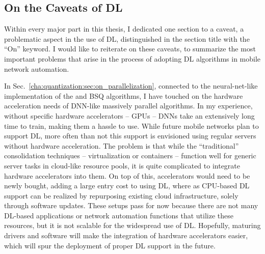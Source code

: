		\subsection{On the Caveats of DL}
			
			Within every major part in this thesis, I dedicated one section to a caveat, a problematic aspect in the use of \ac{DL}, distinguished in the section title with the ``On'' keyword.
			I would like to reiterate on these caveats, to summarize the most important problems that arise in the process of adopting \ac{DL} algorithms in mobile network automation.
			
			In Sec.~\ref{cha:quantization:sec:on_parallelization}, connected to the neural-net-like implementation of the \kmeans{} and \ac{BSQ} algorithms, I have touched on the hardware acceleration needs of \ac{DNN}-like massively parallel algorithms.
			In my experience, without specific hardware accelerators -- \acp{GPU} -- \acp{DNN} take an extensively long time to train, making them a hassle to use.
			While future mobile networks plan to support \ac{DL}, more often than not this support is envisioned using regular servers without hardware acceleration.
			The problem is that while the ``traditional'' consolidation techniques -- virtualization or containers -- function well for generic server tasks in cloud-like resource pools, it is quite complicated to integrate hardware accelerators into them.
			On top of this, accelerators would need to be newly bought, adding a large entry cost to using \ac{DL}, where as \ac{CPU}-based \ac{DL} support can be realized by repurposing existing cloud infrastructure, solely through software updates.
			These setups pass for now because there are not many \ac{DL}-based applications or network automation functions that utilize these resources, but it is not scalable for the widespread use of \ac{DL}.
			Hopefully, maturing drivers and software will make the integration of hardware accelerators easier, which will spur the deployment of proper \ac{DL} support in the future.
			
